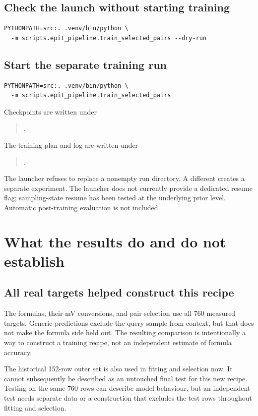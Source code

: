 \documentclass[11pt]{article}
\newcommand{\code}[1]{\texttt{\detokenize{#1}}}
\begin{document}
\subsection{Check the launch without starting training}
\begin{verbatim}
PYTHONPATH=src:. .venv/bin/python \
  -m scripts.epit_pipeline.train_selected_pairs --dry-run
\end{verbatim}

\subsection{Start the separate training run}
\begin{verbatim}
PYTHONPATH=src:. .venv/bin/python \
  -m scripts.epit_pipeline.train_selected_pairs
\end{verbatim}
Checkpoints are written under
\begin{quote}\small
{}.
\end{quote}
The training plan and log are written under
\begin{quote}\small
{}.
\end{quote}
The launcher refuses to replace a nonempty run directory. A different
\code{--run-name} creates a separate experiment. The launcher does not currently
provide a dedicated resume flag; sampling-state resume has been tested at the
underlying prior level. Automatic post-training evaluation is not included.

\section{What the results do and do not establish}
\subsection{All real targets helped construct this recipe}
The formulas, their mV conversions, and pair selection use all 760 measured
targets. Generic predictions exclude the query sample from context, but that
does not make the formula side held out. The resulting comparison is
intentionally a way to construct a training recipe, not an independent estimate
of formula accuracy.

The historical 152-row outer set is also used in fitting and selection now.
It cannot subsequently be described as an untouched final test for this new
recipe. Testing on the same 760 rows can describe model behaviour, but an
independent test needs separate data or a construction that excludes the test
rows throughout fitting and selection.
\end{document}
